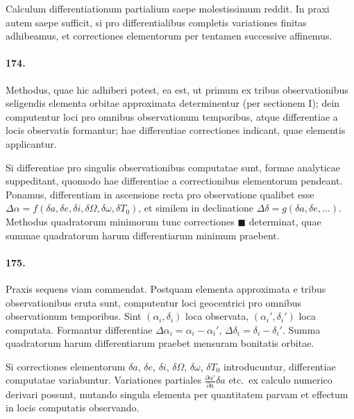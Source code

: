 \documentclass[12pt,a4paper]{article}
\begin{document}
Calculum differentiationum partialium saepe molestissimum reddit. In praxi autem saepe sufficit, si pro differentialibus completis variationes finitas adhibeamus, et correctiones elementorum per tentamen successive affinemus.

\paragraph{174.}
Methodus, quae hic adhiberi potest, ea est, ut primum ex tribus observationibus seligendis elementa orbitae approximata determinentur (per sectionem I); dein computentur loci pro omnibus observationum temporibus, atque differentiae a locis observatis formantur; hae differentiae correctiones indicant, quae elementis applicantur.

Si differentiae pro singulis observationibus computatae sunt, formae analyticae suppeditant, quomodo hae differentiae a correctionibus elementorum pendeant. Ponamus, differentiam in ascensione recta pro observatione qualibet esse $\Delta\alpha = f(\delta a, \delta e, \delta i, \delta\Omega, \delta\omega, \delta T_0)$, et similem in declinatione $\Delta\delta = g(\delta a, \delta e, \ldots)$. Methodus quadratorum minimorum tunc correctiones $\blacksquare$ determinat, quae summae quadratorum harum differentiarum minimum praebent.

\paragraph{175.}
Praxis sequens viam commendat. Postquam elementa approximata e tribus observationibus eruta sunt, computentur loci geocentrici pro omnibus observationum temporibus. Sint $(\alpha_i, \delta_i)$ loca observata, $(\alpha_i', \delta_i')$ loca computata. Formantur differentiae $\Delta\alpha_i = \alpha_i - \alpha_i'$, $\Delta\delta_i = \delta_i - \delta_i'$. Summa quadratorum harum differentiarum praebet mensuram bonitatis orbitae.

Si correctiones elementorum $\delta a$, $\delta e$, $\delta i$, $\delta\Omega$, $\delta\omega$, $\delta T_0$ introducuntur, differentiae computatae variabuntur. Variationes partiales $\frac{\partial\alpha'}{\partial a}\delta a$ etc.~ex calculo numerico derivari possunt, mutando singula elementa per quantitatem parvam et effectum in locis computatis observando.
\end{document}
